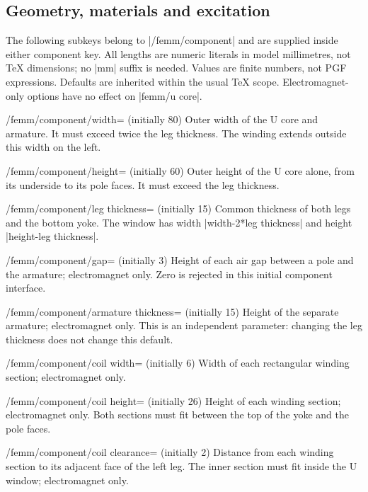 \subsection{Geometry, materials and excitation}
The following subkeys belong to |/femm/component| and are supplied inside
either component key. All lengths are numeric literals in model millimetres,
not TeX dimensions; no |mm| suffix is needed. Values are finite numbers,
not PGF expressions. Defaults are inherited within the usual TeX scope.
Electromagnet-only options have no effect on |femm/u core|.

\begin{key}{/femm/component/width= (initially 80)}
Outer width of the U core and armature. It must exceed twice the leg thickness.
The winding extends outside this width on the left.
\end{key}
\begin{key}{/femm/component/height= (initially 60)}
Outer height of the U core alone, from its underside to its pole faces.
It must exceed the leg thickness.
\end{key}
\begin{key}{/femm/component/leg thickness= (initially 15)}
Common thickness of both legs and the bottom yoke. The window has width
|width-2*leg thickness| and height |height-leg thickness|.
\end{key}
\begin{key}{/femm/component/gap= (initially 3)}
Height of each air gap between a pole and the armature; electromagnet only.
Zero is rejected in this initial component interface.
\end{key}
\begin{key}{/femm/component/armature thickness= (initially 15)}
Height of the separate armature; electromagnet only. This is an independent
parameter: changing the leg thickness does not change this default.
\end{key}
\begin{key}{/femm/component/coil width= (initially 6)}
Width of each rectangular winding section; electromagnet only.
\end{key}
\begin{key}{/femm/component/coil height= (initially 26)}
Height of each winding section; electromagnet only. Both sections must fit
between the top of the yoke and the pole faces.
\end{key}
\begin{key}{/femm/component/coil clearance= (initially 2)}
Distance from each winding section to its adjacent face of the left leg.
The inner section must fit inside the U window; electromagnet only.
\end{key}

